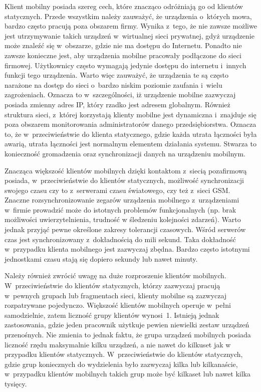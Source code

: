 Klient mobilny posiada szereg cech, które znacząco odróżniają go od
klientów statycznych. Przede wszystkim należy zauważyć, że urządzenia
o~których mowa, bardzo często pracują poza obszarem firmy. Wynika
z~tego, że nie zawsze możliwe jest utrzymywanie takich urządzeń
w~wirtualnej sieci prywatnej, gdyż urządzenie może znaleźć się
w~obszarze, gdzie nie ma dostępu do Internetu. Ponadto nie zawsze
konieczne jest, aby urządzenia mobilne pracowały podłączone do sieci
firmowej. Użytkownicy często wymagają jedynie dostępu do internetu
i~innych funkcji tego urządzenia. Warto więc zauważyć, że urządzenia
te są często narażone na dostęp do sieci o~bardzo niskim poziomie
zaufania i~wielu zagrożeniach. Oznacza to w~szczególności, iż
urządzenie mobilne zazwyczaj posiada zmienny adres IP, który rzadko
jest adresem globalnym. Również struktura sieci, z~której korzystają
klienty mobilne jest dynamiczna i~znajduje się poza obszarem
monitorowania administratorów danego przedsiębiorstwa. Oznacza to, że
w~przeciwieństwie do klienta statycznego, gdzie każda utrata łączności
była awarią, utrata łączności jest normalnym elementem działania
systemu. Stwarza to konieczność gromadzenia oraz synchronizacji danych
na urządzeniu mobilnym.

Znacząca większość klientów mobilnych dzięki kontaktom z~siecią
pozafirmową posiada, w~przeciwieństwie do klientów statycznych,
możliwość synchronizacji swojego czasu czy to z~serwerami czasu
światowego, czy też z~sieci GSM. Znaczne rozsynchronizowanie zegarów
urządzenia mobilnego z~urządzeniami w~firmie prowadzić może do
istotnych problemów funkcjonalnych (np. brak możliwości
uwierzytelnienia, trudność w śledzeniu kolejności zdarzeń). Warto
jednak przyjąć pewne określone zakresy tolerancji czasowych. Wśród
serwerów czas jest synchronizowany z~dokładnością do mili sekund. Taka
dokładność w~przypadku klienta mobilnego jest zazwyczaj
zbędna. Bardzo często istotnymi jednostkami czasu stają się dopiero
sekundy lub nawet minuty.

Należy również zwrócić uwagę na duże rozproszenie klientów
mobilnych. W~przeciwieństwie do klientów statycznych, którzy zazwyczaj
pracują w~pewnych grupach lub fragmentach sieci, klienty mobilne są
zazwyczaj rozpatrywane pojedynczo. Większość klientów mobilnych
operuje w~pełni samodzielnie, zatem liczność grupy klientów
wynosi~1. Istnieją jednak zastosowania, gdzie jeden pracownik użytkuje
pewien niewielki zestaw urządzeń przenośnych. Nie zmienia to jednak
faktu, że grupa urządzeń mobilnych posiada liczność rzędu maksymalnie
kilku urządzeń, a nie nawet do kilkuset jak w przypadku klientów
statycznych. W~przeciwieństwie do klientów statycznych, gdzie grup
koniecznych do wydzielenia było zazwyczaj kilka lub kilkanaście,
w~przypadku klientów mobilnych takich grup może być kilkaset lub nawet
kilka tysięcy.

